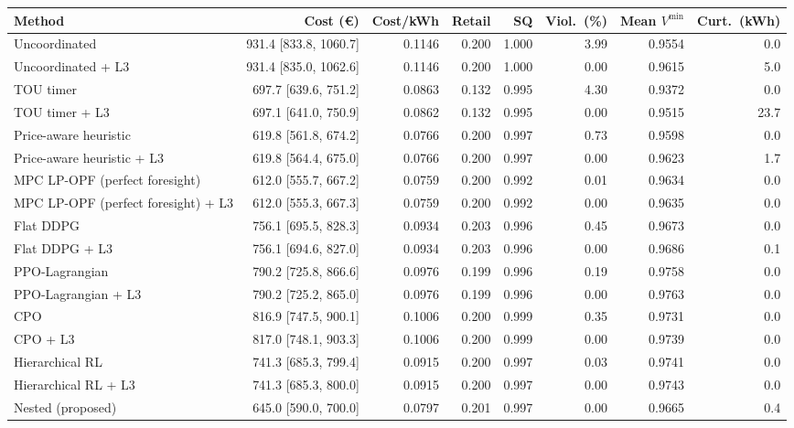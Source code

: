 \begin{tabular}{@{}lrrrrrrr@{}}
\toprule
Method & Cost (\euro) & Cost/kWh & Retail & SQ & Viol.\ (\%) & Mean $V^{\min}$ & Curt.\ (kWh) \\
\midrule
Uncoordinated & 931.4 {\scriptsize[833.8, 1060.7]} & 0.1146 & 0.200 & 1.000 & 3.99 & 0.9554 & 0.0 \\
Uncoordinated + L3 & 931.4 {\scriptsize[835.0, 1062.6]} & 0.1146 & 0.200 & 1.000 & 0.00 & 0.9615 & 5.0 \\
TOU timer & 697.7 {\scriptsize[639.6, 751.2]} & 0.0863 & 0.132 & 0.995 & 4.30 & 0.9372 & 0.0 \\
TOU timer + L3 & 697.1 {\scriptsize[641.0, 750.9]} & 0.0862 & 0.132 & 0.995 & 0.00 & 0.9515 & 23.7 \\
Price-aware heuristic & 619.8 {\scriptsize[561.8, 674.2]} & 0.0766 & 0.200 & 0.997 & 0.73 & 0.9598 & 0.0 \\
Price-aware heuristic + L3 & 619.8 {\scriptsize[564.4, 675.0]} & 0.0766 & 0.200 & 0.997 & 0.00 & 0.9623 & 1.7 \\
MPC LP-OPF (perfect foresight) & 612.0 {\scriptsize[555.7, 667.2]} & 0.0759 & 0.200 & 0.992 & 0.01 & 0.9634 & 0.0 \\
MPC LP-OPF (perfect foresight) + L3 & 612.0 {\scriptsize[555.3, 667.3]} & 0.0759 & 0.200 & 0.992 & 0.00 & 0.9635 & 0.0 \\
\midrule
Flat DDPG & 756.1 {\scriptsize[695.5, 828.3]} & 0.0934 & 0.203 & 0.996 & 0.45 & 0.9673 & 0.0 \\
Flat DDPG + L3 & 756.1 {\scriptsize[694.6, 827.0]} & 0.0934 & 0.203 & 0.996 & 0.00 & 0.9686 & 0.1 \\
PPO-Lagrangian & 790.2 {\scriptsize[725.8, 866.6]} & 0.0976 & 0.199 & 0.996 & 0.19 & 0.9758 & 0.0 \\
PPO-Lagrangian + L3 & 790.2 {\scriptsize[725.2, 865.0]} & 0.0976 & 0.199 & 0.996 & 0.00 & 0.9763 & 0.0 \\
CPO & 816.9 {\scriptsize[747.5, 900.1]} & 0.1006 & 0.200 & 0.999 & 0.35 & 0.9731 & 0.0 \\
CPO + L3 & 817.0 {\scriptsize[748.1, 903.3]} & 0.1006 & 0.200 & 0.999 & 0.00 & 0.9739 & 0.0 \\
Hierarchical RL & 741.3 {\scriptsize[685.3, 799.4]} & 0.0915 & 0.200 & 0.997 & 0.03 & 0.9741 & 0.0 \\
Hierarchical RL + L3 & 741.3 {\scriptsize[685.3, 800.0]} & 0.0915 & 0.200 & 0.997 & 0.00 & 0.9743 & 0.0 \\
\midrule
Nested (proposed) & 645.0 {\scriptsize[590.0, 700.0]} & 0.0797 & 0.201 & 0.997 & 0.00 & 0.9665 & 0.4 \\
\bottomrule
\end{tabular}
